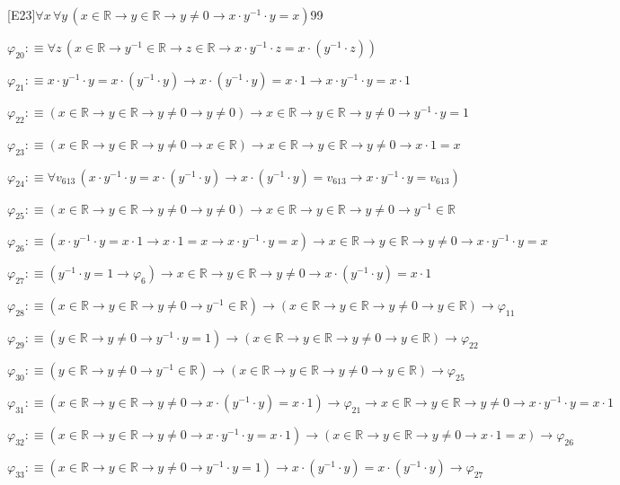 \begin{fullproof}{[E23]}{$\forall x\,\forall y\,(x \in \mathbb{R} \to y \in \mathbb{R} \to y \neq 0 \to x \cdot y^{-1} \cdot y = x)$}{99}
\begin{abbrevlist}
\item $\varphi_{20} :\equiv \forall z\,(x \in \mathbb{R} \to y^{-1} \in \mathbb{R} \to z \in \mathbb{R} \to x \cdot y^{-1} \cdot z = x \cdot (y^{-1} \cdot z))$
\item $\varphi_{21} :\equiv x \cdot y^{-1} \cdot y = x \cdot (y^{-1} \cdot y) \to x \cdot (y^{-1} \cdot y) = x \cdot 1 \to x \cdot y^{-1} \cdot y = x \cdot 1$
\item $\varphi_{22} :\equiv (x \in \mathbb{R} \to y \in \mathbb{R} \to y \neq 0 \to y \neq 0) \to x \in \mathbb{R} \to y \in \mathbb{R} \to y \neq 0 \to y^{-1} \cdot y = 1$
\item $\varphi_{23} :\equiv (x \in \mathbb{R} \to y \in \mathbb{R} \to y \neq 0 \to x \in \mathbb{R}) \to x \in \mathbb{R} \to y \in \mathbb{R} \to y \neq 0 \to x \cdot 1 = x$
\item $\varphi_{24} :\equiv \forall v_{613}\,(x \cdot y^{-1} \cdot y = x \cdot (y^{-1} \cdot y) \to x \cdot (y^{-1} \cdot y) = v_{613} \to x \cdot y^{-1} \cdot y = v_{613})$
\item $\varphi_{25} :\equiv (x \in \mathbb{R} \to y \in \mathbb{R} \to y \neq 0 \to y \neq 0) \to x \in \mathbb{R} \to y \in \mathbb{R} \to y \neq 0 \to y^{-1} \in \mathbb{R}$
\item $\varphi_{26} :\equiv (x \cdot y^{-1} \cdot y = x \cdot 1 \to x \cdot 1 = x \to x \cdot y^{-1} \cdot y = x) \to x \in \mathbb{R} \to y \in \mathbb{R} \to y \neq 0 \to x \cdot y^{-1} \cdot y = x$
\item $\varphi_{27} :\equiv (y^{-1} \cdot y = 1 \to \varphi_{6}) \to x \in \mathbb{R} \to y \in \mathbb{R} \to y \neq 0 \to x \cdot (y^{-1} \cdot y) = x \cdot 1$
\item $\varphi_{28} :\equiv (x \in \mathbb{R} \to y \in \mathbb{R} \to y \neq 0 \to y^{-1} \in \mathbb{R}) \to (x \in \mathbb{R} \to y \in \mathbb{R} \to y \neq 0 \to y \in \mathbb{R}) \to \varphi_{11}$
\item $\varphi_{29} :\equiv (y \in \mathbb{R} \to y \neq 0 \to y^{-1} \cdot y = 1) \to (x \in \mathbb{R} \to y \in \mathbb{R} \to y \neq 0 \to y \in \mathbb{R}) \to \varphi_{22}$
\item $\varphi_{30} :\equiv (y \in \mathbb{R} \to y \neq 0 \to y^{-1} \in \mathbb{R}) \to (x \in \mathbb{R} \to y \in \mathbb{R} \to y \neq 0 \to y \in \mathbb{R}) \to \varphi_{25}$
\item $\varphi_{31} :\equiv (x \in \mathbb{R} \to y \in \mathbb{R} \to y \neq 0 \to x \cdot (y^{-1} \cdot y) = x \cdot 1) \to \varphi_{21} \to x \in \mathbb{R} \to y \in \mathbb{R} \to y \neq 0 \to x \cdot y^{-1} \cdot y = x \cdot 1$
\item $\varphi_{32} :\equiv (x \in \mathbb{R} \to y \in \mathbb{R} \to y \neq 0 \to x \cdot y^{-1} \cdot y = x \cdot 1) \to (x \in \mathbb{R} \to y \in \mathbb{R} \to y \neq 0 \to x \cdot 1 = x) \to \varphi_{26}$
\item $\varphi_{33} :\equiv (x \in \mathbb{R} \to y \in \mathbb{R} \to y \neq 0 \to y^{-1} \cdot y = 1) \to x \cdot (y^{-1} \cdot y) = x \cdot (y^{-1} \cdot y) \to \varphi_{27}$
\end{abbrevlist}
\end{fullproof}
